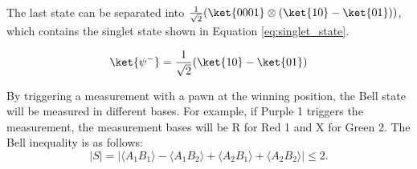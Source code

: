 \documentclass[final,5p,times,twocolumn,authoryear]{elsarticle}
\begin{document}

The last state can be separated into $\frac{1}{\sqrt{2}}(\ket{0001} \otimes (\ket{10} - \ket{01}))$, which contains the singlet state shown in Equation \ref{eq:singlet_state}.

\begin{equation}
    \ket{\psi^-}=\frac{1}{\sqrt{2}}(\ket{10} - \ket{01})
    \label{eq:singlet_state}
\end{equation}

By triggering a measurement with a pawn at the winning position, the Bell state will be measured in different bases. For example, if Purple 1 triggers the measurement, the measurement bases will be R for Red 1 and X for Green 2. The Bell inequality is as follows:
\begin{equation}
    |S| = |\langle A_{1} B_{1} \rangle - \langle A_{1} B_{2} \rangle + \langle A_{2} B_{1} \rangle + \langle A_{2} B_{2} \rangle|  \leq 2
    \text{.}
\end{equation}
\end{document}
